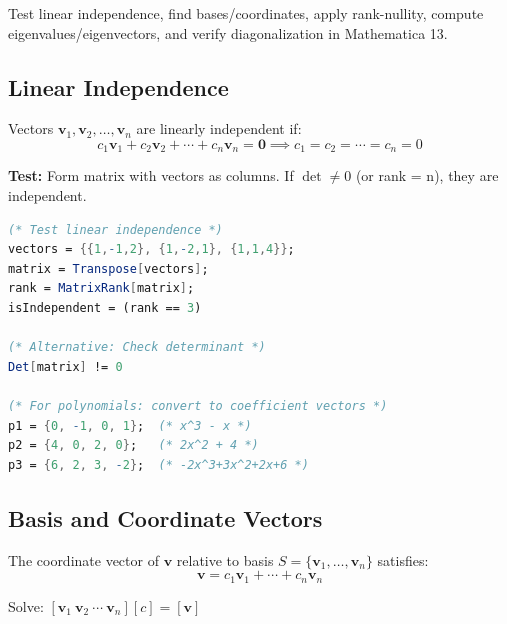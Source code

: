 \documentclass[12pt,a4paper]{article}
\begin{document}
\begin{definitionbox}
    Test linear independence, find bases/coordinates, apply rank-nullity,
    compute eigenvalues/eigenvectors, and verify diagonalization in Mathematica 13.
\end{definitionbox}

\subsection{Linear Independence}

\begin{definitionbox}
    Vectors \(\mathbf{v}_1, \mathbf{v}_2, \ldots, \mathbf{v}_n\) are linearly independent if:
    \[ c_1\mathbf{v}_1 + c_2\mathbf{v}_2 + \cdots + c_n\mathbf{v}_n = \mathbf{0} \implies c_1 = c_2 = \cdots = c_n = 0 \]
    
    \textbf{Test:} Form matrix with vectors as columns. If \(\det \neq 0\) (or rank = n), they are independent.
\end{definitionbox}

\begin{mathematicabox}
    \begin{lstlisting}[language=Mathematica, basicstyle=\ttfamily\small]
(* Test linear independence *)
vectors = {{1,-1,2}, {1,-2,1}, {1,1,4}};
matrix = Transpose[vectors];
rank = MatrixRank[matrix];
isIndependent = (rank == 3)

(* Alternative: Check determinant *)
Det[matrix] != 0

(* For polynomials: convert to coefficient vectors *)
p1 = {0, -1, 0, 1};  (* x^3 - x *)
p2 = {4, 0, 2, 0};   (* 2x^2 + 4 *)
p3 = {6, 2, 3, -2};  (* -2x^3+3x^2+2x+6 *)
    \end{lstlisting}
\end{mathematicabox}

\subsection{Basis and Coordinate Vectors}

\begin{definitionbox}
    The coordinate vector of \(\mathbf{v}\) relative to basis \(S = \{\mathbf{v}_1, \ldots, \mathbf{v}_n\}\) satisfies:
    \[ \mathbf{v} = c_1\mathbf{v}_1 + \cdots + c_n\mathbf{v}_n \]
    
    Solve: \([\mathbf{v}_1 \ \mathbf{v}_2 \ \cdots \ \mathbf{v}_n][c] = [\mathbf{v}]\)
\end{definitionbox}
\end{document}
